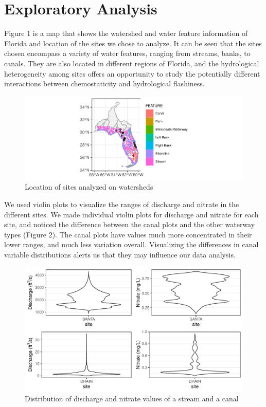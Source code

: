 \documentclass[12pt,]{article}
\begin{document}
\newpage

\hypertarget{exploratory-analysis}{%
\section{Exploratory Analysis}\label{exploratory-analysis}}

Figure 1 is a map that shows the watershed and water feature information
of Florida and location of the sites we chose to analyze. It can be seen
that the sites chosen encompass a variety of water features, ranging
from streams, banks, to canals. They are also located in different
regions of Florida, and the hydrological heterogeneity among sites
offers an opportunity to study the potentially different interactions
between chemostaticity and hydrological flashiness.

\begin{figure}

{\centering \includegraphics{Final-Project-Report_files/figure-latex/unnamed-chunk-3-1} 

}

\caption{Location of sites analyzed on watersheds}\label{fig:unnamed-chunk-3}
\end{figure}

We used violin plots to visualize the ranges of discharge and nitrate in
the different sites. We made individual violin plots for discharge and
nitrate for each site, and noticed the difference between the canal
plots and the other waterway types (Figure 2). The canal plots have
values much more concentrated in their lower ranges, and much less
variation overall. Visualizing the differences in canal variable
distributions alerts us that they may influence our data analysis.

\begin{figure}
\centering
\includegraphics{Final-Project-Report_files/figure-latex/unnamed-chunk-4-1.pdf}
\caption{Distribution of discharge and nitrate values of a stream and a
canal}
\end{figure}
\end{document}
